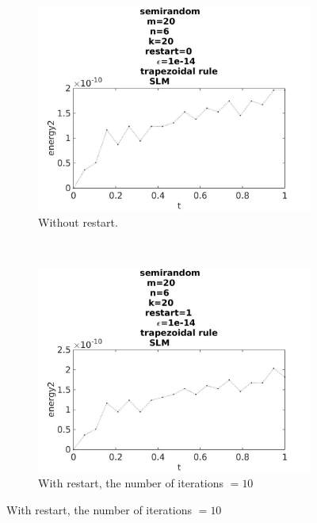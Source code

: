 \begin{figure}[H]
        \centering
        \begin{subfigure}[b]{0.45\textwidth}
                \includegraphics[width=\textwidth]{../MATLAB/fig/energytestrestart0.jpg}
                \caption{ Without restart. }
                \label{fig:energytestrestart0}
        \end{subfigure}
        ~
        \begin{subfigure}[b]{0.45\textwidth}
                \includegraphics[width=\textwidth]{../MATLAB/fig/energytestrestart1.jpg}
                \caption{ With restart, the number of iterations $= 10$ }
                \label{fig:energytestrestart1}
        \end{subfigure}
        

\end{figure}
